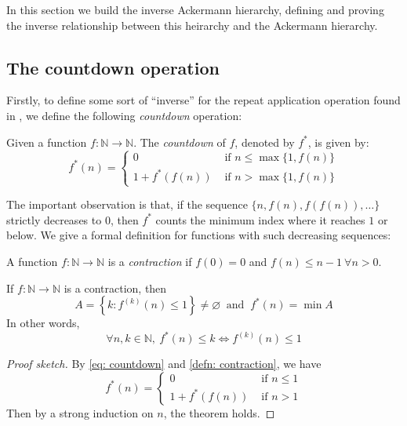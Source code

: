 In this section we build the inverse Ackermann hierarchy, 
defining and proving the inverse relationship between 
this heirarchy and the Ackermann hierarchy.

\subsection{The countdown operation}

Firstly, to define some sort of ``inverse'' for the repeat 
application operation found in , we 
define the following \textit{countdown} operation:

\begin{defn} \label{defn: countdown}
Given a function $f: \mathbb{N} \to \mathbb{N}$. 
The \textit{countdown} of $f$, denoted by $f^*$, is given by:
\begin{equation} \label{eq: countdown}
f^*(n) = \begin{cases}
0 & \text{ if } n \le \max\{1, f(n)\} \\ 1 + f^*(f(n)) & \text{ if } n > \max\{1, f(n)\}
\end{cases}
\end{equation}
\end{defn}
The important observation is that, if the sequence 
$\{n, f(n), f(f(n)), \ldots\}$ strictly decreases to 
$0$, then $f^*$ counts the minimum index where it reaches 
$1$ or below. We give a formal definition for functions 
with such decreasing sequences:

\begin{defn} \label{defn: contraction}
A function $f: \mathbb{N} \to \mathbb{N}$ is a \textit{contraction} if $f(0) = 0$ and $f(n) \le n-1 \ \forall n > 0$.
\end{defn}

\begin{thm} \label{thm: countdown contraction}
If $f: \mathbb{N} \to \mathbb{N}$ is a contraction, then
\begin{equation*}
A = \left\{k: f^{(k)}(n) \le 1\right\} \neq \varnothing \ \text{ and } \ f^*(n) = \min A
\end{equation*}
In other words,
\begin{equation*}
\forall n, k\in \mathbb{N}, \ f^*(n) \le k \iff f^{(k)}(n) \le 1
\end{equation*}
\end{thm}

\begin{proof}[Proof sketch]
By \eqref{eq: countdown} and \cref{defn: contraction}, we have
\begin{equation*}
f^*(n) = \begin{cases}
0 & \text{ if } n \le 1 \\ 1 + f^*(f(n)) & \text{ if } n > 1
\end{cases}
\end{equation*}
Then by a strong induction on $n$, the theorem holds.
\end{proof}

